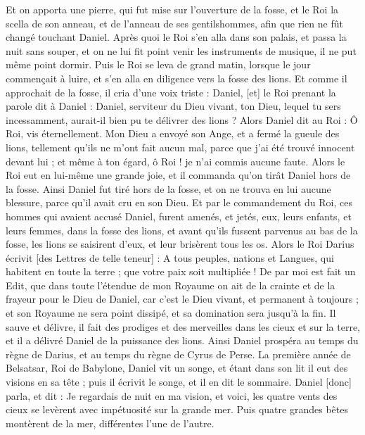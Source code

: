 \begin{multicols}{2}
Et on apporta une pierre, qui fut mise sur l'ouverture de la fosse, et le Roi la scella de son anneau, et de l'anneau de ses gentilshommes, afin que rien ne fût changé touchant Daniel.
Après quoi le Roi s'en alla dans son palais, et passa la nuit sans souper, et on ne lui fit point venir les instruments de musique, il ne put même point dormir.
Puis le Roi se leva de grand matin, lorsque le jour commençait à luire, et s'en alla en diligence vers la fosse des lions.
Et comme il approchait de la fosse, il cria d'une voix triste : Daniel, [et] le Roi prenant la parole dit à Daniel : Daniel, serviteur du Dieu vivant, ton Dieu, lequel tu sers incessamment, aurait-il bien pu te délivrer des lions ?
Alors Daniel dit au Roi : Ô Roi, vis éternellement.
Mon Dieu a envoyé son Ange, et a fermé la gueule des lions, tellement qu'ils ne m'ont fait aucun mal, parce que j'ai été trouvé innocent devant lui ; et même à ton égard, ô Roi ! je n'ai commis aucune faute.
Alors le Roi eut en lui-même une grande joie, et il commanda qu'on tirât Daniel hors de la fosse. Ainsi Daniel fut tiré hors de la fosse, et on ne trouva en lui aucune blessure, parce qu'il avait cru en son Dieu.
Et par le commandement du Roi, ces hommes qui avaient accusé Daniel, furent amenés, et jetés, eux, leurs enfants, et leurs femmes, dans la fosse des lions, et avant qu'ils fussent parvenus au bas de la fosse, les lions se saisirent d'eux, et leur brisèrent tous les os.
Alors le Roi Darius écrivit [des Lettres de telle teneur] : A tous peuples, nations et Langues, qui habitent en toute la terre ; que votre paix soit multipliée !
De par moi est fait un Edit, que dans toute l'étendue de mon Royaume on ait de la crainte et de la frayeur pour le Dieu de Daniel, car c'est le Dieu vivant, et permanent à toujours ; et son Royaume ne sera point dissipé, et sa domination sera jusqu'à la fin.
Il sauve et délivre, il fait des prodiges et des merveilles dans les cieux et sur la terre, et il a délivré Daniel de la puissance des lions.
Ainsi Daniel prospéra au temps du règne de Darius, et au temps du règne de Cyrus de Perse.
\VerseOne{}La première année de Belsatsar, Roi de Babylone, Daniel vit un songe, et étant dans son lit il eut des visions en sa tête ; puis il écrivit le songe, et il en dit le sommaire.
Daniel [donc] parla, et dit : Je regardais de nuit en ma vision, et voici, les quatre vents des cieux se levèrent avec impétuosité sur la grande mer.
Puis quatre grandes bêtes montèrent de la mer, différentes l'une de l'autre.

\end{multicols}
